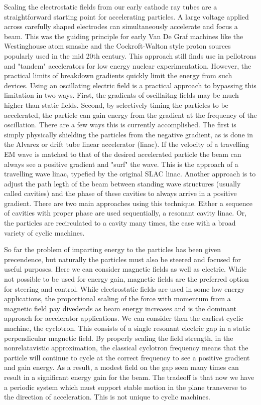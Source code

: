 Scaling the electrostatic fields from our early cathode ray tubes are a straightforward starting point for accelerating particles. A large voltage applied across carefully shaped electrodes can simultaneously accelerate and focus a beam. This was the guiding principle for early Van De Graf machines like the Westinghouse atom smashe and the Cockroft-Walton style proton sources popularly used in the mid 20th century. This approach still finds use in pellotrons and "tandem" accelerators for low energy nuclear experimentation. However, the practical limits of breakdown gradients quickly limit the energy from such devices. Using an oscillating electric field is a practical approach to bypassing this limitation in two ways. First, the gradients of oscillaitng fields may be much higher than static fields. Second, by selectively timing the particles to be accelerated, the particle can gain energy from the gradient at the frequency of the oscillation. There are a few ways this is currently accomplished. The first is simply physically shielding the particles from the negative gradient, as is done in the Alvarez or drift tube linear accelerator (linac). If the velocity of a travelling EM wave is matched to that of the desired accelerated particle the beam can always see a positive gradient and "surf" the wave. This is the approach of a travelling wave linac, typefied by the original SLAC linac. Another approach is to adjust the path legth of the beam between standing wave structures (usually called cavities) and the phase of these cavities to always arrive in a positive gradient. There are two main approaches using this technique. Either a sequence of cavities with proper phase are used sequentially, a resonant cavity linac. Or, the particles are recirculated to a cavity many times, the case with a broad variety of cyclic machines.

So far the problem of imparting energy to the particles has been given precendence, but naturally the particles must also be steered and focused for useful purposes. Here we can consider magnetic fields as well as electric. While not possible to be used for energy gain, magnetic fields are the preferred option for steering and control. While electrostatic fields are used in some low energy applications, the proportional scaling of the force with momentum from a magnetic field pay divedends as beam energy increases and is the dominant approach for accelerator applications. We can consider then the earliest cyclic machine, the cyclotron. This consists of a single resonant electric gap in a static perpendicular magnetic field. By properly scaling the field strength, in the nonrelatavistic approximation, the classical cyclotron frequency means that the particle will continue to cycle at the correct frequency to see a positive gradient and gain energy. As a result, a modest field on the gap seen many times can result in a significant energy gain for the beam. The tradeoff is that now we have a periodic system which must support stable motion in the plane transverse to the direction of acceleration. This is not unique to cyclic machines.

